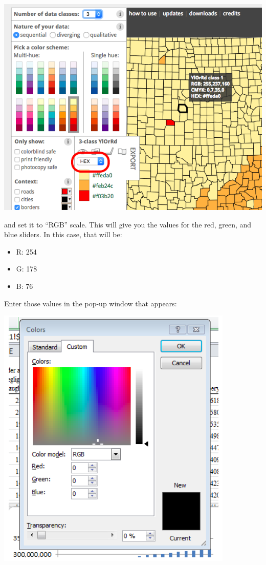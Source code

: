 \documentclass[
]{book}
\providecommand{\tightlist}{%
  \setlength{\itemsep}{0pt}\setlength{\parskip}{0pt}}
\begin{document}
\includegraphics{imgs/choose_col_code.png}

and set it to ``RGB'' scale. This will give you the values for the red, green, and blue sliders. In this case, that will be:

\begin{itemize}
\tightlist
\item
  R: 254
\item
  G: 178
\item
  B: 76
\end{itemize}

Enter those values in the pop-up window that appears:

\includegraphics{imgs/pc_rbg.png}
\end{document}

